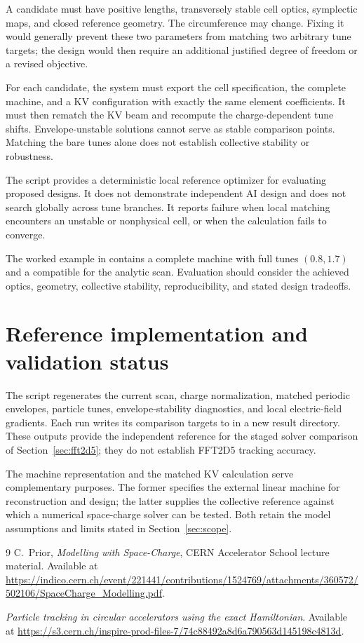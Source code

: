 \documentclass[11pt,a4paper]{article}
\numberwithin{equation}{section}
\begin{document}
A candidate must have positive lengths, transversely stable cell
optics, symplectic maps, and closed reference geometry. The circumference
may change. Fixing it would generally prevent these two parameters from
matching two arbitrary tune targets; the design would then require an
additional justified degree of freedom or a revised objective.

For each candidate, the system must export the cell specification, the
complete machine, and a KV configuration with exactly the same element
coefficients. It must then rematch the KV beam and recompute the
charge-dependent tune shifts. Envelope-unstable solutions cannot serve
as stable comparison points. Matching the bare tunes alone does not
establish collective stability or robustness.

The script  provides a deterministic local
reference optimizer for evaluating proposed designs. It does not
demonstrate independent AI design and does not search globally across
tune branches. It reports failure when local matching encounters an
unstable or nonphysical cell, or when the calculation fails to converge.

The worked example in  contains a
complete machine with full tunes $(0.8,1.7)$ and a compatible
 for the analytic scan. Evaluation should consider
the achieved optics, geometry, collective stability, reproducibility,
and stated design tradeoffs.

\section{Reference implementation and validation status}
\label{sec:implementation}

The script  regenerates the
current scan, charge normalization, matched periodic envelopes, particle
tunes, envelope-stability diagnostics, and local electric-field
gradients. Each run writes its comparison targets to
 in a new result directory. These outputs
provide the independent reference for the staged solver comparison of
Section~\ref{sec:fft2d5}; they do not establish FFT2D5 tracking accuracy.

The machine representation and the matched KV calculation serve
complementary purposes. The former specifies the external linear
machine for reconstruction and design; the latter supplies the
collective reference against which a numerical space-charge solver can
be tested. Both retain the model assumptions and limits stated in
Section~\ref{sec:scope}.

\begin{thebibliography}{9}
C.~Prior, \emph{Modelling with Space-Charge}, CERN Accelerator School
lecture material. Available at
\url{https://indico.cern.ch/event/221441/contributions/1524769/attachments/360572/502106/SpaceCharge_Modelling.pdf}.

\emph{Particle tracking in circular accelerators using the exact
Hamiltonian}. Available at
\url{https://s3.cern.ch/inspire-prod-files-7/74c88492a8d6a790563d145198c4813d}.
\end{thebibliography}
\end{document}
